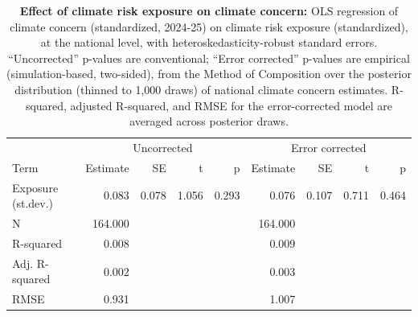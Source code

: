 \begin{table}[ht]
\centering
\begin{tabular}{lrrrrrrrr}
   \hline
 & \multicolumn{4}{c}{Uncorrected} & \multicolumn{4}{c}{Error corrected} \\
 Term & Estimate & SE & t & p & Estimate & SE & t & p \\
\hline
Exposure (st.dev.) & 0.083 & 0.078 & 1.056 & 0.293 & 0.076 & 0.107 & 0.711 & 0.464 \\ 
   \hline
N & 164.000 &  &  &  & 164.000 &  &  &  \\ 
  R-squared & 0.008 &  &  &  & 0.009 &  &  &  \\ 
  Adj. R-squared & 0.002 &  &  &  & 0.003 &  &  &  \\ 
  RMSE & 0.931 &  &  &  & 1.007 &  &  &  \\ 
   \hline
\end{tabular}
\caption{{\bf Effect of climate risk exposure on climate concern:} OLS regression of climate concern (standardized, 2024-25) on climate risk exposure (standardized), at the national level, with heteroskedasticity-robust standard errors. ``Uncorrected'' p-values are conventional; ``Error corrected'' p-values are empirical (simulation-based, two-sided), from the Method of Composition over the posterior distribution (thinned to 1,000 draws) of national climate concern estimates. R-squared, adjusted R-squared, and RMSE for the error-corrected model are averaged across posterior draws.} 
\label{tab:regression.exposure.concern}
\end{table}
